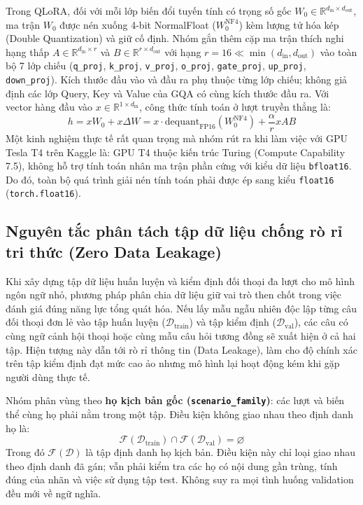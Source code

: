 Trong QLoRA, đối với mỗi lớp biến đổi tuyến tính có trọng số gốc $W_0 \in \mathbb{R}^{d_{\text{in}} \times d_{\text{out}}}$, ma trận $W_0$ được nén xuống 4-bit NormalFloat ($W_0^{\text{NF4}}$) kèm lượng tử hóa kép (Double Quantization) và giữ cố định. Nhóm gắn thêm cặp ma trận thích nghi hạng thấp $A \in \mathbb{R}^{d_{\text{in}} \times r}$ và $B \in \mathbb{R}^{r \times d_{\text{out}}}$ với hạng $r = 16 \ll \min(d_{\text{in}}, d_{\text{out}})$ vào toàn bộ 7 lớp chiếu (\texttt{q\_proj}, \texttt{k\_proj}, \texttt{v\_proj}, \texttt{o\_proj}, \texttt{gate\_proj}, \texttt{up\_proj}, \texttt{down\_proj}). Kích thước đầu vào và đầu ra phụ thuộc từng lớp chiếu; không giả định các lớp Query, Key và Value của GQA có cùng kích thước đầu ra. Với vector hàng đầu vào $x \in \mathbb{R}^{1 \times d_{\text{in}}}$, công thức tính toán ở lượt truyền thẳng là:
\begin{equation}
  h = x W_0 + x \Delta W = x \cdot \text{dequant}_{\text{FP16}}\!\left(W_0^{\text{NF4}}\right) + \frac{\alpha}{r} x A B
  \label{eq:qlora_forward}
\end{equation}
Một kinh nghiệm thực tế rất quan trọng mà nhóm rút ra khi làm việc với GPU Tesla T4 trên Kaggle là: GPU T4 thuộc kiến trúc Turing (Compute Capability 7.5), không hỗ trợ tính toán nhân ma trận phần cứng với kiểu dữ liệu \texttt{bfloat16}. Do đó, toàn bộ quá trình giải nén tính toán phải được ép sang kiểu \texttt{float16} (\texttt{torch.float16}).

\subsection{Nguyên tắc phân tách tập dữ liệu chống rò rỉ tri thức (Zero Data Leakage)}

Khi xây dựng tập dữ liệu huấn luyện và kiểm định đối thoại đa lượt cho mô hình ngôn ngữ nhỏ, phương pháp phân chia dữ liệu giữ vai trò then chốt trong việc đánh giá đúng năng lực tổng quát hóa. Nếu lấy mẫu ngẫu nhiên độc lập từng câu đối thoại đơn lẻ vào tập huấn luyện ($\mathcal{D}_{\text{train}}$) và tập kiểm định ($\mathcal{D}_{\text{val}}$), các câu có cùng ngữ cảnh hội thoại hoặc cùng mẫu câu hỏi tương đồng sẽ xuất hiện ở cả hai tập. Hiện tượng này dẫn tới rò rỉ thông tin (Data Leakage), làm cho độ chính xác trên tập kiểm định đạt mức cao ảo nhưng mô hình lại hoạt động kém khi gặp người dùng thực tế.

Nhóm phân vùng theo \textbf{họ kịch bản gốc (\texttt{scenario\_family})}: các lượt và biến thể cùng họ phải nằm trong một tập. Điều kiện không giao nhau theo định danh họ là:
\begin{equation}
  \mathcal{F}(\mathcal{D}_{\text{train}}) \cap \mathcal{F}(\mathcal{D}_{\text{val}}) = \varnothing
  \label{eq:zero_leakage_condition}
\end{equation}
Trong đó $\mathcal{F}(\mathcal{D})$ là tập định danh họ kịch bản. Điều kiện này chỉ loại giao nhau theo định danh đã gán; vẫn phải kiểm tra các họ có nội dung gần trùng, tính đúng của nhãn và việc sử dụng tập test. Không suy ra mọi tình huống validation đều mới về ngữ nghĩa.

